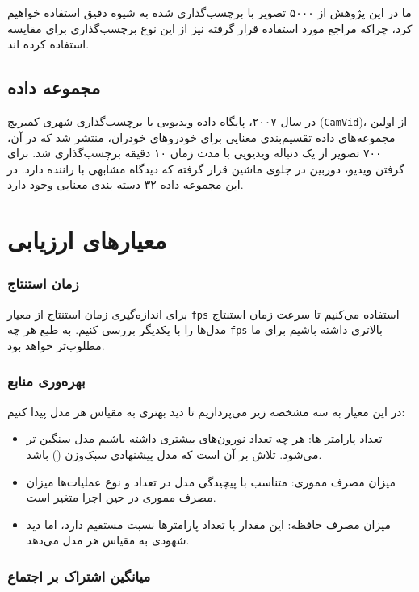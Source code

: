 ما در این پژوهش از ۵۰۰۰ تصویر با برچسب‌گذاری شده به شیوه دقیق استفاده خواهیم کرد، چراکه مراجع مورد استفاده قرار گرفته نیز از این نوع برچسب‌گذاری برای مقایسه استفاده کرده اند.

\subsection{مجموعه داده }

در سال ۲۰۰۷، پایگاه داده ویدیویی با برچسب‌گذاری شهری کمبریج (\verb*|CamVid|)، از اولین مجموعه‌های داده تقسیم‌بندی معنایی برای خودروهای خودران، منتشر شد که در آن، ۷۰۰ تصویر از یک دنباله ویدیویی با مدت زمان ۱۰ دقیقه برچسب‌گذاری شد. برای گرفتن ویدیو، دوربین در جلوی ماشین قرار گرفته که دیدگاه مشابهی با راننده دارد. در این مجموعه داده ۳۲ دسته بندی معنایی وجود دارد.

\section{معیار‌های ارزیابی}

\subsubsection{زمان استنتاج}

برای اندازه‌گیری زمان استنتاج از معیار
\verb*|fps|
استفاده می‌کنیم تا سرعت زمان استنتاج مدل‌ها را با یکدیگر بررسی کنیم. به طبع هر چه
\verb*|fps|
بالاتری داشته باشیم برای ما مطلوب‌تر خواهد بود.


\subsubsection{بهره‌وری منابع}

در این معیار به سه مشخصه زیر می‌پردازیم تا دید بهتری به مقیاس هر مدل پیدا کنیم:

\begin{itemize}
	\item تعداد پارامتر ها: هر چه تعداد نورون‌های بیشتری داشته باشیم مدل سنگین تر می‌شود. تلاش بر آن است که مدل پیشنهادی سبک‌وزن () باشد.
	\item میزان مصرف مموری: متناسب با پیچیدگی مدل در تعداد و نوع عملیات‌ها میزان مصرف مموری در حین اجرا متغیر است.
	\item میزان مصرف حافظه: این مقدار با تعداد پارامتر‌ها نسبت مستقیم دارد، اما دید شهودی به مقیاس هر مدل می‌دهد.
\end{itemize}

\subsubsection{میانگین اشتراک بر اجتماع}

